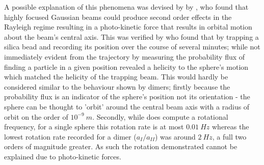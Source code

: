 A possible explanation of this phenomena was devised by by \cite{Yevick2017}, 
who found that highly focused Gaussian beams could produce second 
order effects in the Rayleigh regime resulting in a photo-kinetic 
force that results in orbital motion about the beam's central axis.
This was verified by \cite{Ruffner2012} who found that by trapping 
a silica bead and recording its position over the course of several 
minutes; while not immediately evident from the trajectory by measuring 
the probability flux of finding a particle in a given position 
revealed a helicity to the sphere's motion which matched the helicity 
of the trapping beam. This would hardly be considered similar to 
the behaviour shown by dimers; firstly because the probability flux 
is an indicator of the sphere's position not its orientation - the 
sphere can be thought to 'orbit' around the central beam axis with a 
radius of orbit on the order of $10^{-9}\ m$. Secondly, while 
\cite{Yevick2017} does compute a rotational frequency, for a single 
sphere this rotation rate is at most $0.01\ Hz$ whereas the lowest 
rotation rate recorded for a dimer ($a_{I}/a_{II}$) was around $2\ Hz$, 
a full two orders of magnitude greater. As such the rotation demonstrated
cannot be explained due to photo-kinetic forces.

